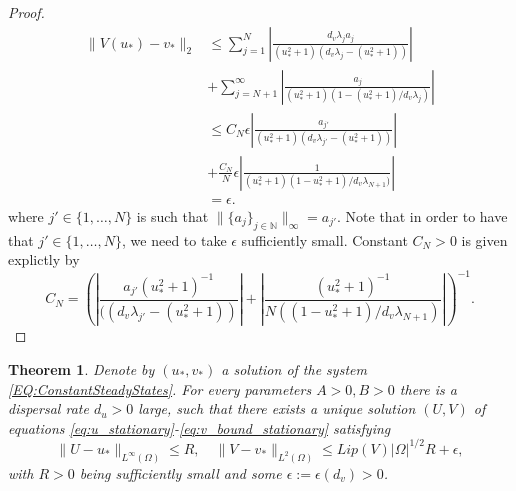 \documentclass[12pt, a4paper]{article}
\theoremstyle{break}
\newtheorem{thm}{Theorem}[section]
\theoremstyle{break}
\theoremstyle{break}
\theoremstyle{break}
\theoremstyle{break}
\theoremstyle{break}
\theoremstyle{break}
\begin{document}
\begin{proof}
    \begin{align*}
        \|V(u_*) - v_*\|_2
        &\leq
        \sum_{j=1}^N\left| \frac{d_v \lambda_j a_j}{(u_*^2+1)(d_v\lambda_j - (u_*^2+1))} \right| \\
        &+
        \sum_{j=N+1}^\infty\left| \frac{a_j}{(u_*^2+1)(1 - (u_*^2+1) / d_v \lambda_j)} \right| \\
        &\leq
        C_N \epsilon \left| \frac{a_{j'}}{(u_*^2+1)(d_v\lambda_{j'} - (u_*^2+1))} \right| \\
        &+
        \frac{C_N}{N} \epsilon \left| \frac{1}{(u_*^2+1)(1 - u_*^2+1) / d_v \lambda_{N+1})} \right| \\
        &= \epsilon.
    \end{align*}
    where $j' \in \{1, \ldots, N\}$ is such that $\|\{a_j\}_{j \in \mathbb{N}}\|_\infty = a_{j'}$. Note that in order to have that $j' \in \{1, \ldots, N\}$, we need to take $\epsilon$ sufficiently small. Constant $C_N > 0$ is given explictly by
    \begin{equation*}
        C_N = \left( \left| \frac{a_{j'}(u_*^2+1)^{-1}}{((d_v\lambda_{j'} - (u_*^2+1))} \right| + \left| \frac{(u_*^2+1)^{-1}}{N((1 - u_*^2+1) / d_v \lambda_{N+1})} \right| \right)^{-1}.
    \end{equation*}
\end{proof}

\begin{thm}
    \label{thm:Stationary-Solutions-Existence}
    Denote by $(u_*, v_*)$ a solution of the system \eqref{EQ:ConstantSteadyStates}. For every parameters $A > 0, B > 0$ there is a dispersal rate $d_u >0$ large, such that there exists a unique solution $(U, V)$ of equations \eqref{eq:u_stationary}-\eqref{eq:v_bound_stationary} satisfying
    \begin{equation}
        \|U - u_*\|_{L^\infty(\Omega)} \leq R, \quad \|V - v_*\|_{L^2(\Omega)} \leq Lip(V) |\Omega|^{1/2} R + \epsilon,
    \end{equation}
    with $R > 0$ being sufficiently small and some $\epsilon := \epsilon(d_v) > 0$.
\end{thm}
\end{document}
